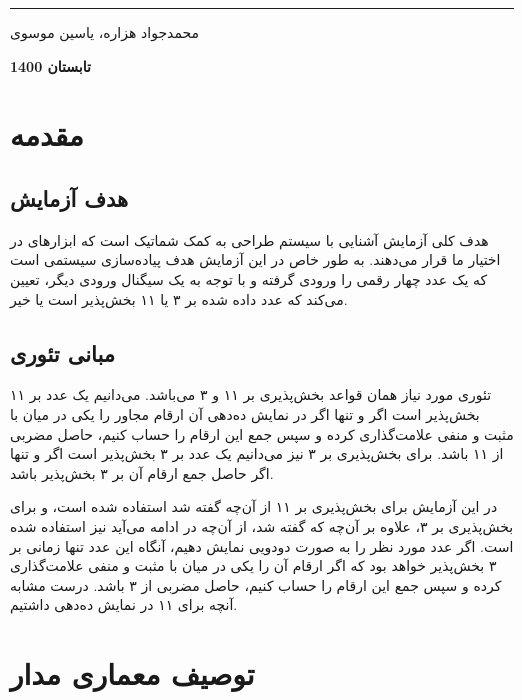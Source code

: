 \documentclass[12pt,onecolumn,a4paper,fleqn]{article}
\begin{document}
\begin{titlepage}
\begin{center}
			\noindent\rule[1ex]{\linewidth}{1pt}
			\vspace*{1.5cm}
			\begin{Large}
					محمدجواد هزاره، یاسین موسوی
					
					\vspace*{1.5cm}
					\textbf{
					تابستان 1400
					}
			\end{Large}			
		\end{center}
		\thispagestyle{empty}
	\end{titlepage}	
	\pagebreak
	
	\tableofcontents
	\thispagestyle{empty}
	\pagebreak
	\section{مقدمه}
	\subsection{هدف آزمایش}
	هدف کلی آزمایش آشنایی با سیستم طراحی به کمک شماتیک است که ابزارهای
	در اختیار ما قرار می‌دهند. به طور خاص در این آزمایش هدف پیاده‌سازی سیستمی است که یک عدد چهار رقمی
	را ورودی گرفته و با توجه به یک سیگنال ورودی دیگر، تعیین می‌کند که عدد داده شده بر ۳ یا ۱۱ بخش‌پذیر است یا خیر.
	\subsection{مبانی تئوری}
	\label{subsection:theory}
	تئوری مورد نیاز همان قواعد بخش‌پذیری بر ۱۱ و ۳ می‌باشد. می‌دانیم یک عدد بر ۱۱ بخش‌پذیر است اگر و تنها اگر در نمایش ده‌دهی آن ارقام مجاور را یکی در میان با مثبت و منفی علامت‌گذاری کرده و سپس جمع این ارقام را حساب کنیم، حاصل مضربی از ۱۱ باشد. برای بخش‌پذیری بر ۳ نیز می‌دانیم یک عدد بر ۳ بخش‌پذیر است اگر و تنها اگر حاصل جمع ارقام آن بر ۳ بخش‌پذیر باشد.
	
	در این آزمایش برای بخش‌پذیری بر ۱۱ از آن‌چه گفته شد استفاده شده است، و برای بخش‌پذیری بر ۳، علاوه بر آن‌چه که گفته شد، از آن‌چه در ادامه می‌آید نیز استفاده شده است. اگر عدد مورد نظر را به صورت دودویی نمایش دهیم، آنگاه این عدد تنها زمانی بر ۳ بخش‌پذیر خواهد بود که اگر ارقام آن را یکی در میان با مثبت و منفی علامت‌گذاری کرده و سپس جمع این ارقام را حساب کنیم، حاصل مضربی از ۳ باشد. درست مشابه آنچه برای ۱۱ در نمایش ده‌دهی داشتیم.
	\pagebreak
	\section{توصیف معماری مدار}
\end{document}
